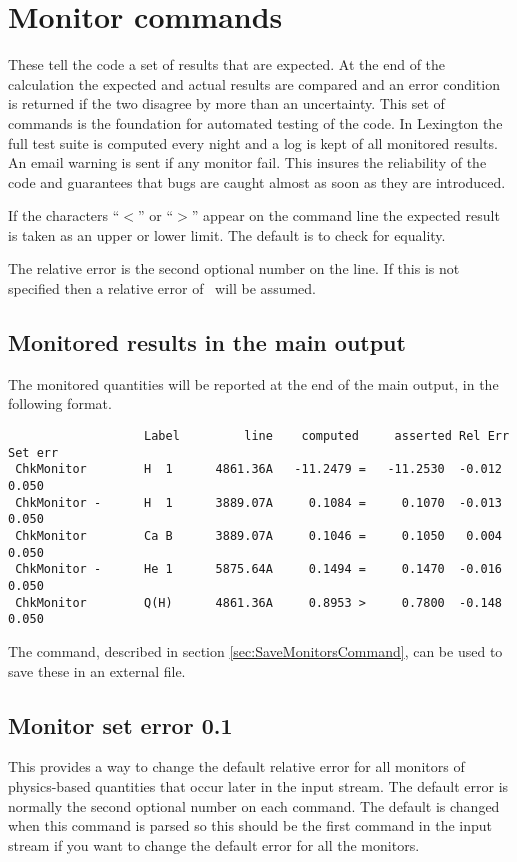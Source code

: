 \section{Monitor commands}
\label{sec:CommandMonitor}

These tell the code a set of results that are expected.
At the end of
the calculation the expected and actual results are compared and an error
condition is returned if the two disagree by more than an uncertainty.
This set of commands is the foundation for automated testing of the code.
In Lexington the full test suite is computed every night and a log is kept
of all monitored results.
An email warning is sent if any monitor fail.
This insures the reliability of the code and guarantees that bugs are caught
almost as soon as they are introduced.

If the characters ``$<$'' or ``$>$'' appear on the
command line the expected result is taken as an upper or lower limit.
The default is to check for equality.

The relative error is the second optional number on the line.
If this
is not specified then a relative error of \ErrorDefault\ will be assumed.

\subsection{Monitored results in the main output}

The monitored quantities will be reported at the end of the main output, in the following format.
\begin{verbatim}
                   Label         line    computed     asserted Rel Err Set err
 ChkMonitor        H  1      4861.36A   -11.2479 =   -11.2530  -0.012   0.050
 ChkMonitor -      H  1      3889.07A     0.1084 =     0.1070  -0.013   0.050
 ChkMonitor        Ca B      3889.07A     0.1046 =     0.1050   0.004   0.050
 ChkMonitor -      He 1      5875.64A     0.1494 =     0.1470  -0.016   0.050
 ChkMonitor        Q(H)      4861.36A     0.8953 >     0.7800  -0.148   0.050
\end{verbatim}
The  command, described in section \ref{sec:SaveMonitorsCommand},
can be used to save these in an external file.
 
\subsection{Monitor set error 0.1}

This provides a way to change the default relative error for all monitors
of physics-based quantities that occur later in the input stream.
The default error is normally the second optional number on each
 command.
The default is changed when this command is parsed so this should
be the first  command in the input stream if
you want to change the default error for all the monitors.

